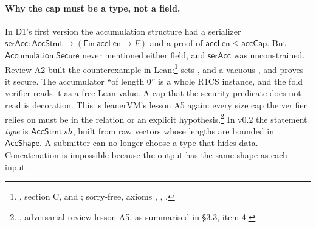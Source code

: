 \paragraph{Why the cap must be a type, not a field.} In D1's first version the accumulation structure
had a serializer $\mathsf{serAcc}:\mathsf{AccStmt}\to(\mathsf{Fin}\ \mathsf{accLen}\to F)$ and a
proof of $\mathsf{accLen}\le\mathsf{accCap}$. But $\mathsf{Accumulation.Secure}$ never mentioned
either field, and $\mathsf{serAcc}$ was unconstrained. Review A2 built the counterexample in
Lean:\footnote{, section C,
 and ; sorry-free, axioms
, , .}  sets
,  and a vacuous , and
 proves it secure.
The accumulator \enquote{of length 0} is a whole R1CS instance, and the fold verifier reads it as a
free Lean value. A cap that the security predicate does not read is decoration. This is leanerVM's
lesson A5 again: every size cap the verifier relies on must be in the relation or an explicit
hypothesis.\footnote{, adversarial-review lesson A5, as summarised in
 §3.3, item 4.} In v0.2 the statement \emph{type} is $\mathsf{AccStmt}\ \mathit{sh}$,
built from raw vectors whose lengths are bounded in $\mathsf{AccShape}$. A submitter can no longer
choose a type that hides data. Concatenation is impossible because the output has the same shape as
each input.

